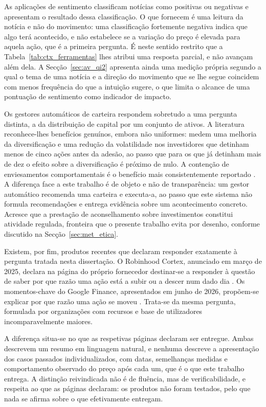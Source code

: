 As aplicações de sentimento classificam notícias como positivas ou negativas e apresentam o
resultado dessa classificação. O que fornecem é uma leitura da notícia e não do movimento: uma
classificação fortemente negativa indica que algo terá acontecido, e não estabelece se a
variação do preço é elevada para aquela ação, que é a primeira pergunta. É neste sentido
restrito que a Tabela~\ref{tab:ctx_ferramentas} lhes atribui uma resposta parcial, e não
avançam além dela. A Secção~\ref{sec:av_qi2} apresenta ainda uma medição própria segundo a qual o tema de uma
notícia e a direção do movimento que se lhe segue coincidem com menos frequência do que a intuição
sugere, o que limita o alcance de uma pontuação de sentimento como indicador de impacto.

Os gestores automáticos de carteira respondem sobretudo a uma pergunta distinta, a da distribuição
de capital por um conjunto de ativos. A literatura reconhece-lhes benefícios genuínos, embora não
uniformes: \textcite{dacunto2019robo} medem uma melhoria da diversificação e uma redução da
volatilidade nos investidores que detinham menos de cinco ações antes da adesão, ao passo que para
os que já detinham mais de dez o efeito sobre a diversificação é próximo de nulo. A contenção de
enviesamentos comportamentais é o benefício mais consistentemente reportado
\autocite{dacunto2019robo, cardillo2024robo}. A diferença face a este trabalho é de objeto e não de
transparência: um gestor automático recomenda uma carteira e executa-a, ao passo que este sistema
não formula recomendações e entrega evidência sobre um acontecimento concreto. Acresce que a
prestação de aconselhamento sobre investimentos constitui atividade regulada, fronteira que o
presente trabalho evita por desenho, conforme discutido na Secção~\ref{sec:met_etica}.

Existem, por fim, produtos recentes que declaram responder exatamente à pergunta tratada nesta
dissertação. O Robinhood Cortex, anunciado em março de 2025, declara na página do próprio
fornecedor destinar-se a responder à questão de saber por que razão uma ação está a subir ou a
descer num dado dia \autocite{robinhood2025cortex}. Os momentos-chave do Google Finance,
apresentados em junho de 2026, propõem-se explicar por que razão uma ação se moveu
\autocite{google2026finance}. Trata-se da mesma pergunta, formulada por organizações com recursos e
base de utilizadores incomparavelmente maiores.

A diferença situa-se no que as respetivas páginas
declaram ser entregue. Ambas descrevem um resumo em linguagem natural, e nenhuma descreve a
apresentação dos casos passados individualizados, com datas, semelhanças medidas e comportamento
observado do preço após cada um, que é o que este trabalho entrega. A distinção reivindicada não é
de fluência, mas de verificabilidade, e respeita ao que as páginas declaram: os produtos não foram
testados, pelo que nada se afirma sobre o que efetivamente entregam.

